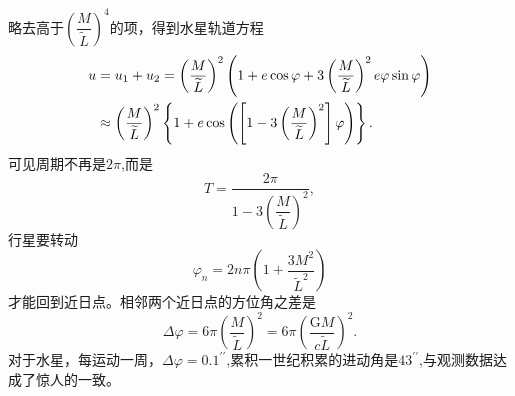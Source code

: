 \documentclass[11pt, a4paper, oneside, onecolumn]{ctexart}
\numberwithin{equation}{subsection}
\begin{document}
略去高于$\left(\dfrac{M}{\widetilde{L}}\right)^{4}$的项，得到水星轨道方程
\begin{align}
u&=u_{1}+u_{2}=\left(\frac{M}{\widetilde{L}}\right)^{2}\left(1+e\cos\varphi+3\left(\frac{M}{\widetilde{L}}\right)^{2}e\varphi\sin\varphi\right)\notag\\
&\approx\left(\frac{M}{\widetilde{L}}\right)^{2}\left\{1+e\cos\left(\left[1-3\left(\frac{M}{\widetilde{L}}\right)^{2}\right]\varphi\right)\right\}.
\end{align}
可见周期不再是$2\pi$,而是
\begin{equation}
T=\frac{2\pi}{1-3\left(\dfrac{M}{\widetilde{L}}\right)^{2}},
\end{equation}
行星要转动
\begin{equation}
\varphi_{n}=2n\pi\left(1+\frac{3M^{2}}{\widetilde{L}^{2}}\right)
\end{equation}
才能回到近日点。相邻两个近日点的方位角之差是
\begin{equation}
\Delta{}\varphi=6\pi\left(\frac{M}{\widetilde{L}}\right)^{2}=6\pi\left(\frac{\mathrm{G}M}{c\widetilde{L}}\right)^{2}.
\end{equation}
对于水星，每运动一周，$\Delta{}\varphi=0.1^{\prime\prime}$,累积一世纪积累的进动角是$43^{\prime\prime}$,与观测数据达成了惊人的一致。
\end{document}

